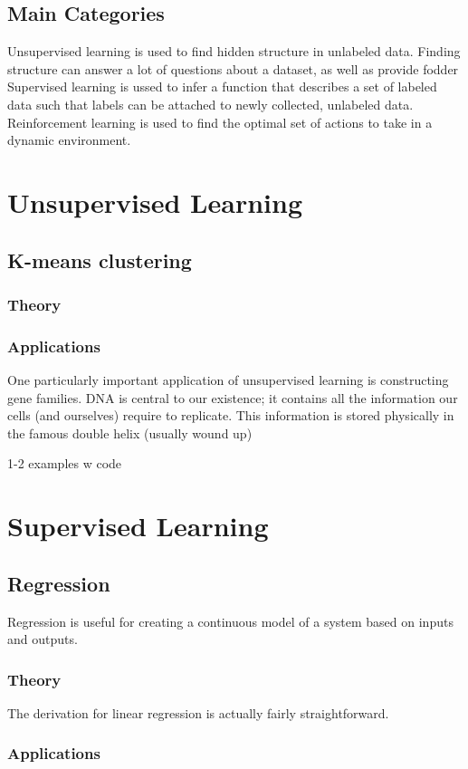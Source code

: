 \documentclass[11pt]{article}
\begin{document}
\subsection{Main Categories}
Unsupervised learning is used to find hidden structure in unlabeled data.
Finding structure can answer a lot of questions about a dataset, as well as provide fodder 
Supervised learning is ussed to infer a function that describes a set of labeled data such that labels can be attached to newly collected, unlabeled data.
Reinforcement learning is used to find the optimal set of actions to take in a dynamic environment.

\section{Unsupervised Learning}
\subsection{K-means clustering}
\subsubsection{Theory}
\subsubsection{Applications}
One particularly important application of unsupervised learning is constructing gene families. DNA is central to our existence; it contains all the information our cells (and ourselves) require to replicate. This information is stored physically in the famous double helix (usually wound up)

1-2 examples w code

\section{Supervised Learning}
\subsection{Regression}
Regression is useful for creating a continuous model of a system based on inputs and outputs.
\subsubsection{Theory}
The derivation for linear regression is actually fairly straightforward.
\subsubsection{Applications}
\end{document}
